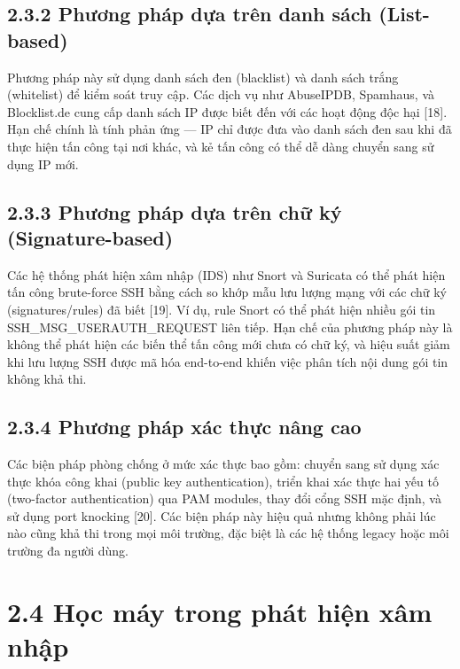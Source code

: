 \documentclass[
  a4paper]{report}
\begin{document}
\subsection{2.3.2 Phương pháp dựa trên danh sách
(List-based)}\label{phux1b0ux1a1ng-phuxe1p-dux1ef1a-truxean-danh-suxe1ch-list-based}

Phương pháp này sử dụng danh sách đen (blacklist) và danh sách trắng
(whitelist) để kiểm soát truy cập. Các dịch vụ như AbuseIPDB, Spamhaus,
và Blocklist.de cung cấp danh sách IP được biết đến với các hoạt động
độc hại {[}18{]}. Hạn chế chính là tính phản ứng --- IP chỉ được đưa vào
danh sách đen sau khi đã thực hiện tấn công tại nơi khác, và kẻ tấn công
có thể dễ dàng chuyển sang sử dụng IP mới.

\subsection{2.3.3 Phương pháp dựa trên chữ ký
(Signature-based)}\label{phux1b0ux1a1ng-phuxe1p-dux1ef1a-truxean-chux1eef-kuxfd-signature-based}

Các hệ thống phát hiện xâm nhập (IDS) như Snort và Suricata có thể phát
hiện tấn công brute-force SSH bằng cách so khớp mẫu lưu lượng mạng với
các chữ ký (signatures/rules) đã biết {[}19{]}. Ví dụ, rule Snort có thể
phát hiện nhiều gói tin SSH\_MSG\_USERAUTH\_REQUEST liên tiếp. Hạn chế
của phương pháp này là không thể phát hiện các biến thể tấn công mới
chưa có chữ ký, và hiệu suất giảm khi lưu lượng SSH được mã hóa
end-to-end khiến việc phân tích nội dung gói tin không khả thi.

\subsection{2.3.4 Phương pháp xác thực nâng
cao}\label{phux1b0ux1a1ng-phuxe1p-xuxe1c-thux1ef1c-nuxe2ng-cao}

Các biện pháp phòng chống ở mức xác thực bao gồm: chuyển sang sử dụng
xác thực khóa công khai (public key authentication), triển khai xác thực
hai yếu tố (two-factor authentication) qua PAM modules, thay đổi cổng
SSH mặc định, và sử dụng port knocking {[}20{]}. Các biện pháp này hiệu
quả nhưng không phải lúc nào cũng khả thi trong mọi môi trường, đặc biệt
là các hệ thống legacy hoặc môi trường đa người dùng.

\section{2.4 Học máy trong phát hiện xâm
nhập}\label{hux1ecdc-muxe1y-trong-phuxe1t-hiux1ec7n-xuxe2m-nhux1eadp}
\end{document}
